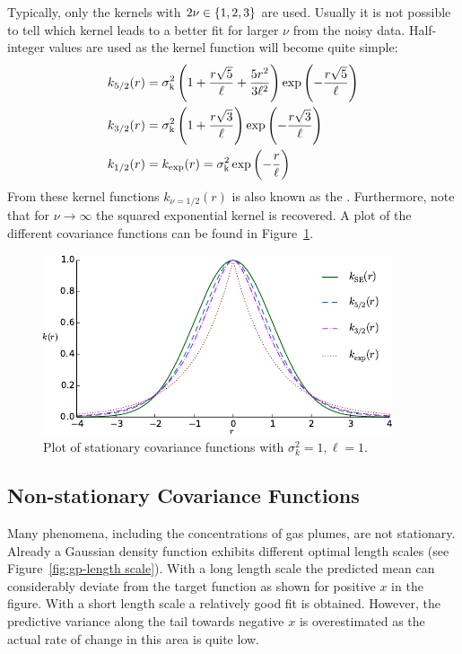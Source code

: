 Typically, only the kernels with $2\nu \in \cbr{1, 2, 3}$ are used.  Usually it 
is not possible to tell which kernel leads to a better fit for larger $\nu$ from 
the noisy data.  Half-integer values are used as the kernel function will become 
quite simple:
\begin{align}
    k_{5/2}(r) &= \sigma\ped{k}^2 \del{1 + \frac{r\sqrt{5}}{\ell} 
        + \frac{5r^2}{3\ell^2}} \exp\del{-\frac{r\sqrt{5}}{\ell}} \\
    k_{3/2}(r) &= \sigma\ped{k}^2 \del{1 + \frac{r\sqrt{3}}{\ell}} 
    \exp\del{-\frac{r\sqrt{3}}{\ell}} \\
    k_{1/2}(r) &= k_{\exp}(r) = \sigma\ped{k}^2 \exp\del{-\frac{r}{\ell}}
\end{align}
From these kernel functions $k_{\nu=1/2}(r)$ is also known as the 
. Furthermore, note that for $\nu \rightarrow 
\infty$ the squared exponential kernel is recovered. A plot of the different 
covariance functions can be found in Figure~\ref{fig:kernels}.

\begin{figure}
    \centering
    \includegraphics{plots/kernels}
    \caption[Covariance functions]{Plot of stationary covariance functions with 
        $\sigma_k^2 = 1, \ell = 1$.}\label{fig:kernels}
\end{figure}

\subsection{Non-stationary Covariance Functions}
Many phenomena, including the concentrations of gas plumes, are not stationary.  
Already a Gaussian density function exhibits different optimal length scales 
(see Figure~\ref{fig:gp-length scale}).  With a long length scale the predicted 
mean can considerably deviate from the target function as shown for positive $x$ 
in the figure. With a short length scale a relatively good fit is obtained.  
However, the predictive variance along the tail towards negative $x$ is 
overestimated as the actual rate of change in this area is quite low.

